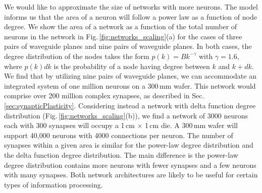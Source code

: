 \documentclass[twocolumn]{article}
\begin{document}
We would like to approximate the size of networks with more neurons. The model informs us that the area of a neuron will follow a power law as a function of node degree. We show the area of a network as a function of the total number of neurons in the network in Fig.\,\ref{fig:networks_scaling}(a) for the cases of three pairs of waveguide planes and nine pairs of waveguide planes. In both cases, the degree distribution of the nodes takes the form $p(k) = Bk^{-\gamma}$ with $\gamma = 1.6$, where $p(k)dk$ is the probability of a node having degree between $k$ and $k+dk$. We find that by utilizing nine pairs of waveguide planes, we can accommodate an integrated system of one million neurons on a 300\,mm wafer. This network would comprise over 200 million complex synapses, as described in Sec.\,\ref{sec:synapticPlasticity}. Considering instead a network with delta function degree distribution (Fig.\,\ref{fig:networks_scaling}(b)), we find a network of 3000 neurons each with 300 synapses will occupy a 1\,cm $\times$ 1\,cm die. A 300\,mm wafer will support 40,000 neurons with 4000 connections per neuron. The number of synapses within a given area is similar for the power-law degree distribution and the delta function degree distribution. The main difference is the power-law degree distribution contains more neurons with fewer synapses and a few neurons with many synapses. Both network architectures are likely to be useful for certain types of information processing.
\end{document}
